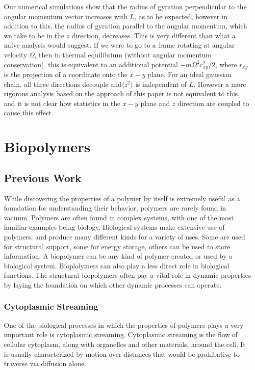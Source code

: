 \documentclass[11pt]{ucthesis}
\begin{document}
Our numerical simulations show that the radius of gyration perpendicular
to the angular momentum vector increases with $L$, as to be expected,
however in addition to this, the radius of gyration parallel to the
angular momentum, which we take to be in the $z$ direction, decreases.
This is very different than what a naive analysis would suggest. If we
were to go to a frame rotating at angular velocity $\Omega$, then in
thermal equilibrium (without angular momentum conservation), this is
equivalent to an additional potential $- m \Omega^2 r^2_{xy}/2$, where
$r_{xy}$ is the projection of a coordinate onto the $x-y$ plane.  For an ideal
gaussian chain, all three directions decouple and$\langle z^2\rangle$
is independent of $L$. However a more rigorous analysis based on the
approach of this paper is not equivalent to this, and it is not clear
how statistics in the $x-y$ plane and $z$ direction are coupled to cause
this effect.


\part{Biopolymers}

\chapter{Previous Work}
While discovering the properties of a polymer by itself is extremely useful as a foundation for understanding their behavior, polymers are rarely found in vacuum.
Polymers are often found in complex systems, with one of the most familiar examples being biology.
Biological systems make extensive use of polymers, and produce many different kinds for a variety of uses.
Some are used for structural support, some for energy storage, others can be used to store information.
A biopolymer can be any kind of polymer created or used by a biological system.
Bioplolymers can also play a less direct role in biological functions.
The structural biopolymers often pay a vital role in dynamic properties by laying the foundation on which other dynamic processes can operate.


\section{Cytoplasmic Streaming}
One of the biological processes in which the properties of polymers plays a very important role is cytoplasmic streaming. 
Cytoplasmic streaming is the flow of cellular cytoplasm, along with organelles and other materials, around the cell. 
It is usually characterized by motion over distances that would be prohibative to traverse via diffusion alone.
\end{document}
